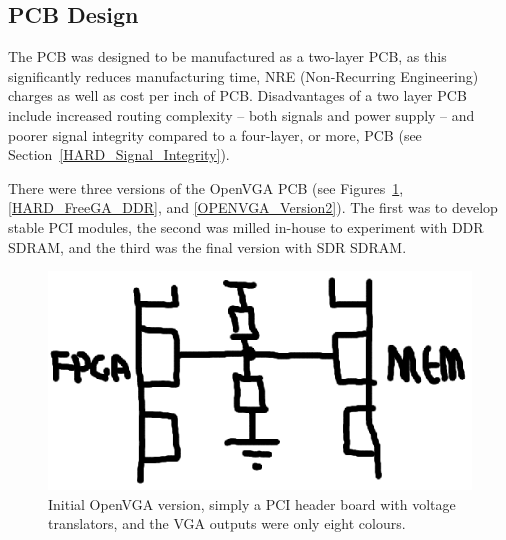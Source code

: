 \subsection{PCB Design}
The PCB was designed to be manufactured as a two-layer PCB, as this
significantly reduces manufacturing time, NRE (Non-Recurring Engineering)
charges as well as cost per inch of PCB\cite{Our_PCB}. Disadvantages of a two
layer PCB include increased routing complexity -- both signals and power supply
-- and poorer signal integrity compared to a four-layer, or more, PCB (see
Section~\ref{HARD_Signal_Integrity}).

There were three versions of the OpenVGA PCB (see Figures~\ref{HARD_PCI_Stub},
\ref{HARD_FreeGA_DDR}, and \ref{OPENVGA_Version2}). The first was to develop
stable PCI modules, the second was milled in-house to experiment with DDR SDRAM, and the
third was the final version with SDR SDRAM.

\begin{figure}
\begin{center}
\includegraphics[width=\linewidth]{images/async_fifo.eps}
\caption[PCI Stub Board]{Initial OpenVGA version, simply a PCI header board
with voltage translators, and the VGA outputs were only eight colours.}
\label{HARD_PCI_Stub}
\end{center}
\end{figure}

